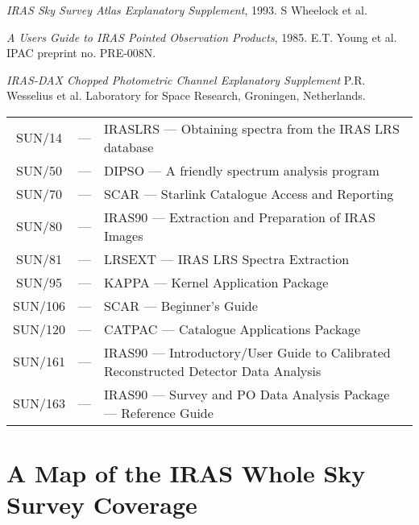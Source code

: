 {\em IRAS Sky Survey Atlas Explanatory Supplement}, 1993. S Wheelock et al.

{\em A Users Guide to IRAS Pointed Observation Products}, 1985. E.T. Young et
al. IPAC preprint no. PRE-008N.

{\em IRAS-DAX Chopped Photometric Channel Explanatory Supplement} P.R. Wesselius
 et al. Laboratory for Space Research, Groningen, Netherlands.

\begin{tabular}{ccl}
SUN/14&---&IRASLRS --- Obtaining spectra from the IRAS LRS database\\
SUN/50&---&DIPSO --- A friendly spectrum analysis program\\
SUN/70&---&SCAR --- Starlink Catalogue Access and Reporting\\
SUN/80&---&IRAS90 --- Extraction and Preparation of IRAS Images\\
SUN/81&---&LRSEXT --- IRAS LRS Spectra Extraction\\
SUN/95&---&KAPPA --- Kernel Application Package\\
SUN/106&---&SCAR --- Beginner's Guide\\
SUN/120&---&CATPAC --- Catalogue Applications Package\\
SUN/161&---&IRAS90 --- Introductory/User Guide to Calibrated Reconstructed
Detector Data Analysis\\
SUN/163&---&IRAS90 --- Survey and PO Data Analysis Package --- Reference
Guide\\
\end{tabular}
\appendix
\section{A Map of the IRAS Whole Sky Survey Coverage}
\label{a}

